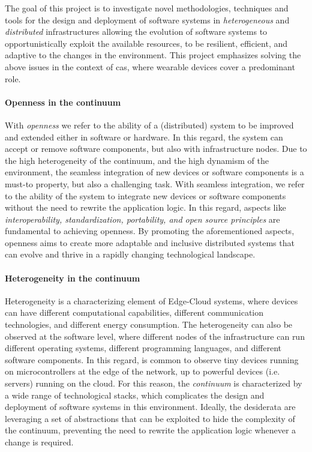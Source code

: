 \documentclass[12pt,a4paper]{article}
\begin{document}
The goal of this project is to investigate novel methodologies,
techniques and tools for the design and deployment of software systems in \emph{heterogeneous} and \emph{distributed} infrastructures
allowing the evolution of software systems to opportunistically exploit the available resources,
to be resilient, efficient, and adaptive to the changes in the environment.
%
This project emphasizes solving the above issues in the context of \ac{cas},
where wearable devices cover a predominant role.

\paragraph{Openness in the continuum}
With \emph{openness} we refer to the ability of a (distributed) system to be improved and extended either in software or hardware.
%
In this regard,
the system can accept or remove software components,
but also with infrastructure nodes.
%
Due to the high heterogeneity of the continuum,
and the high dynamism of the environment,
the seamless integration of new devices or software components is a must-to property,
but also a challenging task.
%
With seamless integration,
we refer to the ability of the system to integrate new devices or software components without the need to rewrite the application logic.
%
In this regard,
aspects like \emph{interoperability, standardization, portability, and open source principles} are fundamental to achieving openness.
%
By promoting the aforementioned aspects,
openness aims to create more adaptable and inclusive distributed systems that can evolve and thrive in a rapidly changing technological landscape.

\paragraph{Heterogeneity in the continuum}
Heterogeneity is a characterizing element of Edge-Cloud systems,
where devices can have different computational capabilities,
different communication technologies,
and different energy consumption. 
%
The heterogeneity can also be observed at the software level,
where different nodes of the infrastructure can run different operating systems,
different programming languages,
and different software components.
%
In this regard,
is common to observe tiny devices running on microcontrollers at the edge of the network,
up to powerful devices (i.e. servers) running on the cloud.
%
For this reason,
the \emph{continuum} is characterized by a wide range of technological stacks,
which complicates the design and deployment of software systems in this environment.
%
Ideally,
the desiderata are leveraging a set of abstractions that can be exploited to hide the complexity of the continuum,
preventing the need to rewrite the application logic whenever a change is required.
\end{document}
